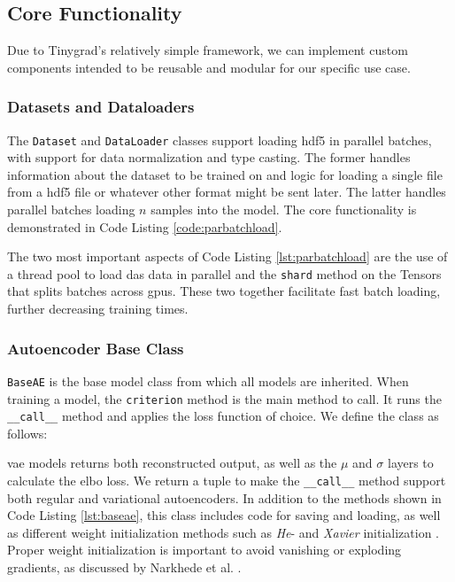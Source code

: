 \subsection{Core Functionality}

Due to Tinygrad's relatively simple framework, we can implement custom components intended to be reusable and modular for our specific use case.

\subsubsection{Datasets and Dataloaders}

The \texttt{Dataset} and \texttt{DataLoader} classes support loading \acrshort{hdf5} in parallel batches, with support for data normalization and type casting. The former handles information about the dataset to be trained on and logic for loading a single file from a \acrshort{hdf5} file or whatever other format might be sent later. The latter handles parallel batches loading $n$ samples into the model. The core functionality is demonstrated in Code Listing \ref{code:parbatchload}.



The two most important aspects of Code Listing \ref{lst:parbatchload} are the use of a thread pool to load \acrshort{das} data in parallel and the \lstinline{shard} method on the Tensors that splits batches across \acrshort{gpu}s. These two together facilitate fast batch loading, further decreasing training times.

\subsubsection{Autoencoder Base Class}

\lstinline{BaseAE} is the base model class from which all models are inherited. When training a model, the \lstinline{criterion} method is the main method to call. It runs the \lstinline{__call__} method and applies the loss function of choice.  We define the class as follows:



\acrshort{vae} models returns both reconstructed output, as well as the $\mu$ and $\sigma$ layers to calculate the \acrshort{elbo} loss. We return a tuple to make the \lstinline{__call__} method support both regular and variational autoencoders.
In addition to the methods shown in Code Listing \ref{lst:baseae}, this class includes code for saving and loading, as well as different weight initialization methods such as \textit{He}- and \textit{Xavier} initialization \cite{kumar2017weight}. Proper weight initialization is important to avoid vanishing or exploding gradients, as discussed by Narkhede et al. \cite{narkhede2022review}. 

